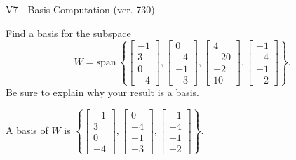 \begin{exercise}
  \begin{exerciseTitle}V7 - Basis Computation (ver. 730)\end{exerciseTitle}
  \begin{exerciseStatement}
    Find a basis for the subspace 
\[W=\mathrm{span}\ \left\{\left[\begin{array}{r}
-1 \\
3 \\
0 \\
-4
\end{array}\right] , \left[\begin{array}{r}
0 \\
-4 \\
-1 \\
-3
\end{array}\right] , \left[\begin{array}{r}
4 \\
-20 \\
-2 \\
10
\end{array}\right] , \left[\begin{array}{r}
-1 \\
-4 \\
-1 \\
-2
\end{array}\right]\right\}.\]
 Be sure to explain why your result is a basis.


  \end{exerciseStatement}
  \begin{exerciseAnswer}
   A basis of \(W\) is  \(\left\{\left[\begin{array}{r}
-1 \\
3 \\
0 \\
-4
\end{array}\right] , \left[\begin{array}{r}
0 \\
-4 \\
-1 \\
-3
\end{array}\right] , \left[\begin{array}{r}
-1 \\
-4 \\
-1 \\
-2
\end{array}\right]\right\}\).
  


  \end{exerciseAnswer}
\end{exercise}